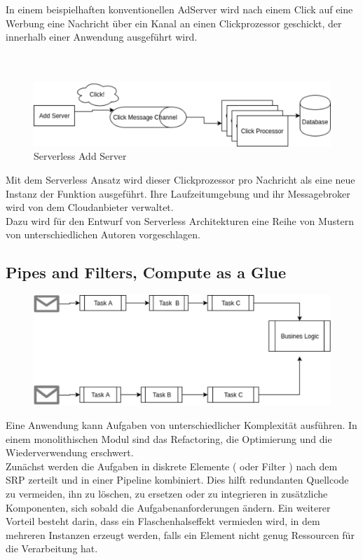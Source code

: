 \documentclass[
12pt,
english,
ngerman,
headsepline,
twoside,
openright,
numbers=noenddot,version=first
]{scrreprt}
\begin{document}
In einem beispielhaften konventionellen AdServer wird nach einem Click auf eine Werbung eine Nachricht über ein Kanal an einen Clickprozessor geschickt, der innerhalb einer Anwendung ausgeführt wird.\\ \\ \\

\begin{figure}
	\includegraphics[scale=0.30]{./pics/serverless-example.eps}
	\caption{Serverless Add Server}
	\label{pic:serverless-add}
\end{figure}

Mit dem Serverless Ansatz wird dieser Clickprozessor pro Nachricht als eine neue Instanz der Funktion ausgeführt. Ihre Laufzeitumgebung und ihr Messagebroker wird von dem Cloudanbieter verwaltet. \cite{fowlerBlogServerless}\\
 

Dazu wird für den Entwurf von Serverless Architekturen eine Reihe von Mustern von unterschiedlichen Autoren vorgeschlagen.\\


\subsection{Pipes and Filters, Compute as a Glue}
\label{sec:pipes-filters}
\begin{figure}
	\includegraphics[width=0.9\linewidth]{./pics/pipes-and-filters.eps}
\end{figure}
Eine Anwendung kann Aufgaben von unterschiedlicher Komplexität ausführen. In einem monolithischen Modul sind das Refactoring, die Optimierung und die Wiederverwendung erschwert. \\
Zunächst werden die Aufgaben in diskrete Elemente ( oder Filter ) nach dem \acrshort{SRP} zerteilt und in einer Pipeline kombiniert. Dies hilft redundanten Quellcode zu vermeiden, ihn zu löschen, zu ersetzen oder zu integrieren in zusätzliche Komponenten, sich sobald die Aufgabenanforderungen ändern\cite{patternsCloud}. Ein weiterer Vorteil besteht darin, dass ein Flaschenhalseffekt vermieden wird, in dem mehreren Instanzen erzeugt werden, falls ein Element nicht genug Ressourcen für die Verarbeitung hat. 
\end{document}
